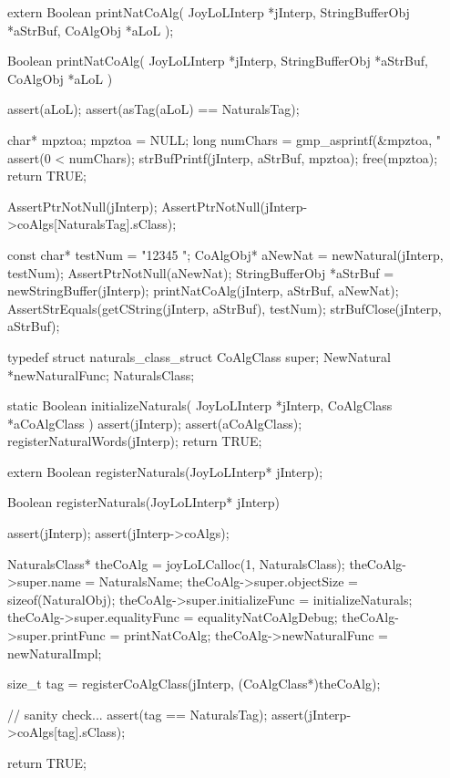 
\startCHeader
extern Boolean printNatCoAlg(
  JoyLoLInterp    *jInterp,
  StringBufferObj *aStrBuf,
  CoAlgObj        *aLoL
);
\stopCHeader
{}

\startCCode
Boolean printNatCoAlg(
  JoyLoLInterp    *jInterp,
  StringBufferObj *aStrBuf,
  CoAlgObj        *aLoL
) {
  assert(aLoL);
  assert(asTag(aLoL) == NaturalsTag);

  char* mpztoa;
  mpztoa = NULL;
  long numChars = gmp_asprintf(&mpztoa, "%
  assert(0 < numChars);
  strBufPrintf(jInterp, aStrBuf, mpztoa);
  free(mpztoa);
  return TRUE;
}
\stopCCode


\startCTest
  AssertPtrNotNull(jInterp);
  AssertPtrNotNull(jInterp->coAlgs[NaturalsTag].sClass);

  const char* testNum = "12345 ";
  CoAlgObj* aNewNat = newNatural(jInterp, testNum);
  AssertPtrNotNull(aNewNat);
  StringBufferObj *aStrBuf = newStringBuffer(jInterp);
  printNatCoAlg(jInterp, aStrBuf, aNewNat);
  AssertStrEquals(getCString(jInterp, aStrBuf), testNum);
  strBufClose(jInterp, aStrBuf);
\stopCTest
\stopTestCase
\stopTestSuite

\startTestSuite[registerSymbols]

\startCHeader
typedef struct naturals_class_struct {
  CoAlgClass super;
  NewNatural *newNaturalFunc;
} NaturalsClass;
\stopCHeader

\startCCode
static Boolean initializeNaturals(
  JoyLoLInterp *jInterp,
  CoAlgClass   *aCoAlgClass
) {
  assert(jInterp);
  assert(aCoAlgClass);
  registerNaturalWords(jInterp);
  return TRUE;
}
\stopCCode

\startCHeader
extern Boolean registerNaturals(JoyLoLInterp* jInterp);
\stopCHeader
{}

\startCCode
Boolean registerNaturals(JoyLoLInterp* jInterp) {
  assert(jInterp);
  assert(jInterp->coAlgs);
  
  NaturalsClass* theCoAlg        = joyLoLCalloc(1, NaturalsClass);
  theCoAlg->super.name           = NaturalsName;
  theCoAlg->super.objectSize     = sizeof(NaturalObj);
  theCoAlg->super.initializeFunc = initializeNaturals;
  theCoAlg->super.equalityFunc   = equalityNatCoAlgDebug;
  theCoAlg->super.printFunc      = printNatCoAlg;
  theCoAlg->newNaturalFunc       = newNaturalImpl;

  size_t tag =
    registerCoAlgClass(jInterp, (CoAlgClass*)theCoAlg);
  
  // sanity check...
  assert(tag == NaturalsTag);
  assert(jInterp->coAlgs[tag].sClass);

  return TRUE;
}
\stopCCode


